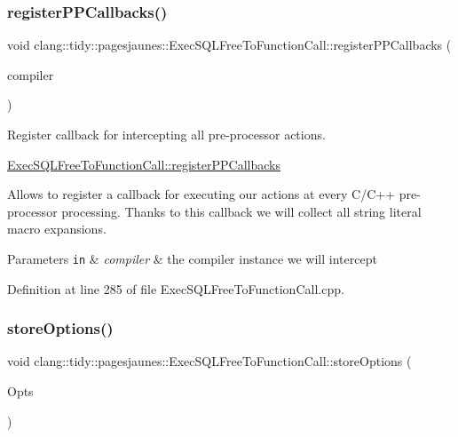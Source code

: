\subsubsection{\texorpdfstring{register\+P\+P\+Callbacks()}{registerPPCallbacks()}}
{\footnotesize\ttfamily void clang\+::tidy\+::pagesjaunes\+::\+Exec\+S\+Q\+L\+Free\+To\+Function\+Call\+::register\+P\+P\+Callbacks (\begin{DoxyParamCaption}\item[{Compiler\+Instance \&}]{compiler }\end{DoxyParamCaption})\hspace{0.3cm}{\ttfamily [override]}}



Register callback for intercepting all pre-\/processor actions. 

\hyperlink{classclang_1_1tidy_1_1pagesjaunes_1_1_exec_s_q_l_free_to_function_call_ac02e35d73287fc5b930c6122b2fcb1b4}{Exec\+S\+Q\+L\+Free\+To\+Function\+Call\+::register\+P\+P\+Callbacks}

Allows to register a callback for executing our actions at every C/\+C++ pre-\/processor processing. Thanks to this callback we will collect all string literal macro expansions.


\begin{DoxyParams}[1]{Parameters}
\mbox{\tt in}  & {\em compiler} & the compiler instance we will intercept \\
\hline
\end{DoxyParams}


Definition at line 285 of file Exec\+S\+Q\+L\+Free\+To\+Function\+Call.\+cpp.

\mbox{\label{classclang_1_1tidy_1_1pagesjaunes_1_1_exec_s_q_l_free_to_function_call_af83c40cd6384a2f9f2f9be2111addb93}} 
\subsubsection{\texorpdfstring{store\+Options()}{storeOptions()}}
{\footnotesize\ttfamily void clang\+::tidy\+::pagesjaunes\+::\+Exec\+S\+Q\+L\+Free\+To\+Function\+Call\+::store\+Options (\begin{DoxyParamCaption}\item[{Clang\+Tidy\+Options\+::\+Option\+Map \&}]{Opts }\end{DoxyParamCaption})\hspace{0.3cm}{\ttfamily [override]}}



